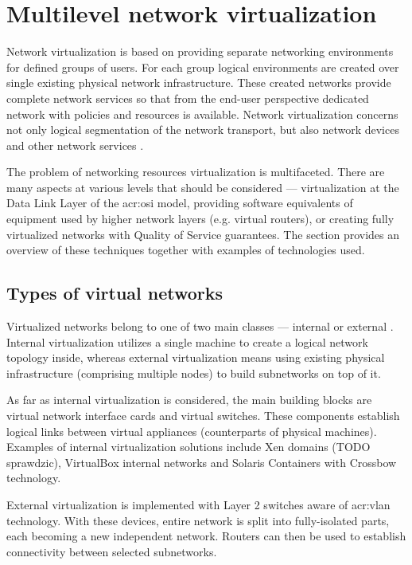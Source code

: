 \documentclass[11pt]{book}
\begin{document}
    \section{Multilevel network virtualization}
    \label{sec:ctx:multi}

      Network virtualization is based on providing separate networking environments for defined groups of users. For
      each group logical environments are created over single existing physical network infrastructure. These created
      networks provide complete network services so that from the end-user perspective dedicated network with policies
      and resources is available. Network virtualization concerns not only logical segmentation of the network
      transport, but also network devices and other network services \cite{network_virt}.

      The problem of networking resources virtualization is multifaceted. There are many aspects at various levels that
      should be considered --- virtualization at the Data Link Layer of the \gls{acr:osi} model, providing software
      equivalents of equipment used by higher network layers (e.g. virtual routers), or creating fully virtualized
      networks with Quality of Service guarantees. The section provides an overview of these techniques together with
      examples of technologies used.


      \subsection{Types of virtual networks}

        Virtualized networks belong to one of two main classes --- internal or external \cite{nsag}. Internal
        virtualization utilizes a single machine to create a logical network topology inside, whereas external
        virtualization means using existing physical infrastructure (comprising multiple nodes) to build subnetworks on
        top of it.

        As far as internal virtualization is considered, the main building blocks are virtual network interface cards
        and virtual switches. These components establish logical links between virtual appliances (counterparts of
        physical machines). Examples of internal virtualization solutions include Xen domains (TODO sprawdzic),
        VirtualBox internal networks \cite{vboxum} and Solaris Containers with Crossbow technology.

        External virtualization is implemented with Layer 2 switches aware of \gls{acr:vlan} technology. With these
        devices, entire network is split into fully-isolated parts, each becoming a new independent network. Routers can
        then be used to establish connectivity between selected subnetworks.
\end{document}
